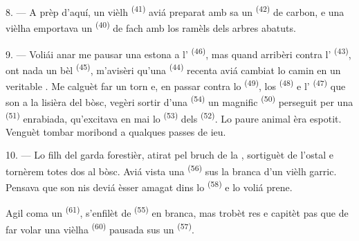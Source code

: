 8. --- A prèp d'aquí, un vièlh  \textsuperscript{(41)} aviá
preparat amb sa  un  \textsuperscript{(42)} de carbon,
e una vièlha emportava un  \textsuperscript{(40)} de  fach amb los ramèls dels arbres abatuts.

\VUsaut{3.0mm}
\VUsaut{3.0mm}

9. --- Voliái anar me pausar una estona a l'
\textsuperscript{(46)}, mas quand arribèri contra l'
\textsuperscript{(43)}, ont nada un bèl  \textsuperscript{(45)},
m'avisèri qu'una  \textsuperscript{(44)} recenta aviá cambiat
lo camin en un veritable . Me calguèt far un torn e, en passar
contra lo  \textsuperscript{(49)}, los 
\textsuperscript{(48)} e l' \textsuperscript{(47)} que son a la
lisièra del bòsc, vegèri sortir d'una  \textsuperscript{(54)} un
magnific  \textsuperscript{(50)} perseguit per una  \textsuperscript{(51)} enrabiada, qu'excitava en mai lo 
\textsuperscript{(53)} dels  \textsuperscript{(52)}. Lo
paure animal èra espotit. Venguèt tombar moribond a qualques passes de ieu.

10. --- Lo filh del garda forestièr, atirat pel bruch de la ,
sortiguèt de l'ostal e tornèrem totes dos al bòsc. Aviá vista una 
\textsuperscript{(56)} sus la branca d'un vièlh garric. Pensava que son nis deviá
èsser amagat dins lo  \textsuperscript{(58)} e lo voliá prene.

Agil coma un  \textsuperscript{(61)}, s'enfilèt de
 \textsuperscript{(55)} en branca, mas trobèt res e capitèt pas que
de far volar una vièlha  \textsuperscript{(60)} pausada sus un
 \textsuperscript{(57)}.
\VUsaut{4.0mm}
\VUfilet{22mm}
